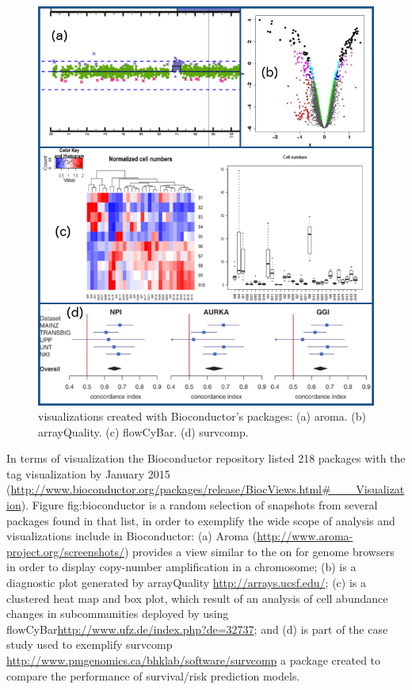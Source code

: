 \begin{figure}  
\centering
\includegraphics[width=\textwidth]{figures/bioconductor.png}
\caption[visualizations created with Bioconductor's packages.]{visualizations created with Bioconductor's packages: (a) aroma. (b) arrayQuality. (c) flowCyBar. (d) survcomp.
\label{fig:bioconductor}}
\end{figure}

In terms of visualization the Bioconductor repository listed 218 packages with the tag visualization by January 2015 (\url{http://www.bioconductor.org/packages/release/BiocViews.html#___Visualization}). Figure {fig:bioconductor} is a random selection of snapshots from several packages found in that list, in order to exemplify the wide scope of analysis and visualizations include in Bioconductor: (a) Aroma (\url{http://www.aroma-project.org/screenshots/}) provides a view similar to the on for genome browsers in order to display copy-number amplification in a chromosome; (b) is a diagnostic plot generated by arrayQuality \url{http://arrays.ucsf.edu/}; (c) is a clustered heat map and box plot, which result of an analysis of cell abundance changes in subcommunities deployed by using flowCyBar\url{http://www.ufz.de/index.php?de=32737}; and (d) is part of the case study used to exemplify survcomp \url{http://www.pmgenomics.ca/bhklab/software/survcomp} a package created to compare the performance of survival/risk prediction models. 


